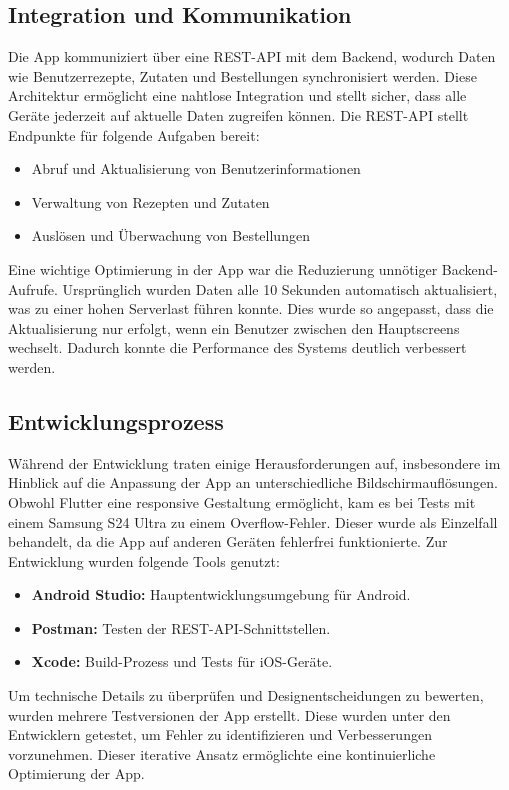 \subsection{Integration und Kommunikation}
Die App kommuniziert über eine REST-API mit dem Backend, wodurch Daten wie Benutzerrezepte, Zutaten und Bestellungen synchronisiert werden. Diese Architektur ermöglicht eine nahtlose Integration und stellt sicher, dass alle Geräte jederzeit auf aktuelle Daten zugreifen können. Die REST-API stellt Endpunkte für folgende Aufgaben bereit:

\begin{itemize}
    \item Abruf und Aktualisierung von Benutzerinformationen
    \item Verwaltung von Rezepten und Zutaten
    \item Auslösen und Überwachung von Bestellungen
\end{itemize}

Eine wichtige Optimierung in der App war die Reduzierung unnötiger Backend-Aufrufe. Ursprünglich wurden Daten alle 10 Sekunden automatisch aktualisiert, was zu einer hohen Serverlast führen konnte. Dies wurde so angepasst, dass die Aktualisierung nur erfolgt, wenn ein Benutzer zwischen den Hauptscreens wechselt. Dadurch konnte die Performance des Systems deutlich verbessert werden.

\subsection{Entwicklungsprozess}
Während der Entwicklung traten einige Herausforderungen auf, insbesondere im Hinblick auf die Anpassung der App an unterschiedliche Bildschirmauflösungen. Obwohl Flutter eine responsive Gestaltung ermöglicht, kam es bei Tests mit einem Samsung S24 Ultra zu einem Overflow-Fehler. Dieser wurde als Einzelfall behandelt, da die App auf anderen Geräten fehlerfrei funktionierte. Zur Entwicklung wurden folgende Tools genutzt:

\begin{itemize}
    \item \textbf{Android Studio:} Hauptentwicklungsumgebung für Android.
    \item \textbf{Postman:} Testen der REST-API-Schnittstellen.
    \item \textbf{Xcode:} Build-Prozess und Tests für iOS-Geräte.
\end{itemize}

Um technische Details zu überprüfen und Designentscheidungen zu bewerten, wurden mehrere Testversionen der App erstellt. Diese wurden unter den Entwicklern getestet, um Fehler zu identifizieren und Verbesserungen vorzunehmen. Dieser iterative Ansatz ermöglichte eine kontinuierliche Optimierung der App.

